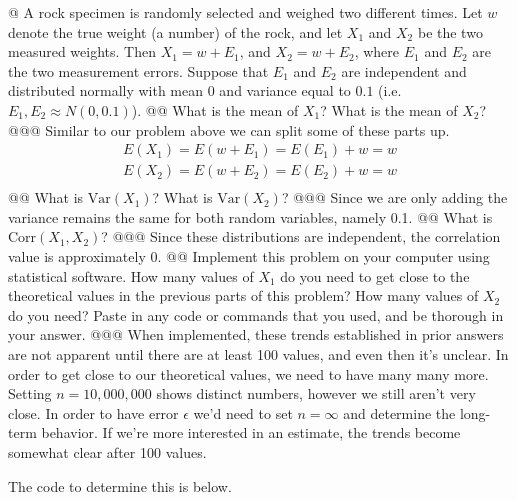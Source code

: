 \documentclass[10pt]{article}
\begin{document}
\begin{easylist}[enumerate]
    @ A rock specimen is randomly selected and weighed two different times. Let $w$ denote the true weight (a number) of
    the rock, and let $X_1$ and $X_2$ be the two measured weights. Then $X_1 = w + E_1$, and $X_2 = w + E_2$, where
    $E_1$ and $E_2$ are the two measurement errors. Suppose that $E_1$ and $E_2$ are independent and distributed
    normally with mean 0 and variance equal to $0.1$ (i.e.\ $E_1, E_2 \approx N(0, 0.1)$).
    @@ What is the mean of $X_1$? What is the mean of $X_2$?
    @@@ Similar to our problem above we can split some of these parts up.
    \[
        \begin{aligned}
            E(X_1) = E(w + E_1) = E(E_1) + w = w\\
            E(X_2) = E(w + E_2) = E(E_2) + w = w\\
        \end{aligned}
    \]
    @@ What is $\text{Var}(X_1)$? What is $\text{Var}(X_2)$?
    @@@ Since we are only adding the variance remains the same for both random variables, namely 0.1.
    @@ What is $\text{Corr}(X_1, X_2)$?
    @@@ Since these distributions are independent, the correlation value is approximately 0.
    @@ Implement this problem on your computer using statistical software. How many values of $X_1$ do you need to get
    close to the theoretical values in the previous parts of this problem? How many values of $X_2$ do you need? Paste
    in any code or commands that you used, and be thorough in your answer.
    @@@ When implemented, these trends established in prior answers are not apparent until there are at least 100
    values, and even then it's unclear. In order to get close to our theoretical values, we need to have many many more.
    Setting $n=10,000,000$ shows distinct numbers, however we still aren't very close. In order to have error $\epsilon$
    we'd need to set $n=\infty$ and determine the long-term behavior. If we're more interested in an estimate, the
    trends become somewhat clear after 100 values.

    The code to determine this is below.

    \newpage

\end{easylist}
\end{document}
